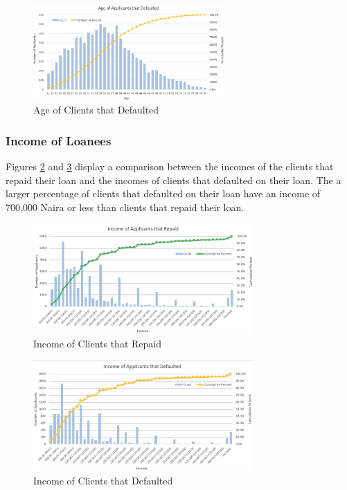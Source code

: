 \vspace{10 pt}

\begin{figure}[!htb]
\centering
\includegraphics[width=0.65\textwidth]{images/defaulted_age.png}
\caption{Age of Clients that Defaulted}
\label{fig:age_defaulted}
\end{figure}

\vspace{10 pt}

\subsubsection{Income of Loanees}

Figures \ref{fig:income_paid} and \ref{fig:income_defaulted} display a comparison between the incomes of the clients that repaid their loan and the incomes of clients that defaulted on their loan. The a larger percentage of clients that defaulted on their loan have an income of 700,000 Naira or less than clients that repaid their loan.   

\vspace{10 pt}

\begin{figure}[!htb]
\centering
\includegraphics[width=0.75\textwidth]{images/repaid_income.png}
\caption{Income of Clients that Repaid}
\label{fig:income_paid}
\end{figure}

\vspace{10 pt}

\begin{figure}[!htb]
\centering
\includegraphics[width=0.75\textwidth]{images/defaulted_income.png}
\caption{Income of Clients that Defaulted}
\label{fig:income_defaulted}
\end{figure}

